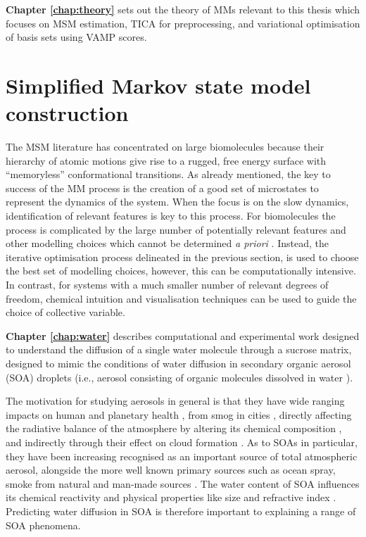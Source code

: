 \textbf{Chapter \ref{chap:theory}} sets out the theory of MMs relevant to this thesis which focuses on MSM estimation, TICA for preprocessing, and variational optimisation of basis sets using VAMP scores. 


\section{Simplified Markov state model construction}
 The MSM literature has concentrated on large biomolecules because their hierarchy of atomic motions \cite{frauenfelderEnergyLandscapesMotions1991} give rise to a rugged, free energy surface with ``memoryless'' conformational transitions. As already mentioned, the key to success of the MM process is the creation of a good set of microstates to represent the dynamics of the system. When the focus is on the slow dynamics, identification of relevant features is key to this process. For biomolecules the process is complicated by the large number of potentially relevant features and other modelling choices which cannot be determined \emph{a priori} \cite{shallowayMacrostatesClassicalStochastic1996}. Instead, the iterative optimisation process delineated in the previous section, is used to choose the best set of modelling choices, however, this can be computationally intensive.  In contrast, for systems with a much smaller number of relevant degrees of freedom, chemical intuition and  visualisation techniques can be used to guide the choice of collective variable.

\textbf{Chapter \ref{chap:water}} describes computational and experimental work designed to understand the diffusion of a single water molecule through a sucrose matrix, designed to mimic the conditions of water diffusion in secondary organic aerosol (SOA) droplets  \cite{songTransientCavityDynamics2020a} (i.e., aerosol consisting of organic molecules dissolved in water \cite[chapter 1]{stepheningramCausesMagnitudesAtmospheric2019}). 


The motivation for studying aerosols in general is that they have wide ranging impacts on human and planetary health \cite{Ingram2017}, from smog in cities \cite{StopDenyingRisks2019}, directly affecting the radiative balance of the atmosphere by altering its chemical composition \cite{irvineHalvingWarmingIdealized2019}, and indirectly through their effect on cloud formation \cite{farmerAtmosphericProcessesTheir2015}. As to SOAs in particular, they have been increasing recognised as an important source of total atmospheric aerosol, alongside the more well known primary sources such as ocean spray, smoke from natural and man-made sources \cite{mcconnellSeasonalVariationsPhysical2008}. The water content of SOA influences its chemical reactivity \cite{varutbangkulHygroscopicitySecondaryOrganic2006} and physical properties like size and refractive index \cite{steimerElectrodynamicBalanceMeasurements2015,tangSimultaneousDeterminationRefractive1991}. Predicting water diffusion in SOA is therefore important to explaining a range of SOA phenomena. 

